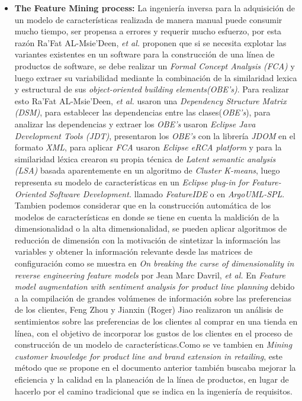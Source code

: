\begin{itemize}
	\item{ \textbf{The Feature Mining process:}}
	La ingeniería inversa para la adquisición de un modelo de características realizada de manera manual puede consumir mucho tiempo, ser propensa a errores y requerir mucho esfuerzo, por esta razón Ra'Fat AL-Msie'Deen, \textit{et al.}\cite{Al2013} proponen que si se necesita explotar las variantes existentes en un software para la construcción de una línea de productos de software, se debe realizar un \textit{Formal Concept Analysis (FCA)} y luego extraer su variabilidad mediante la combinación de la similaridad lexica y estructural de sus \textit{object-oriented building elements(OBE's)}. Para realizar esto Ra'Fat AL-Msie'Deen, \textit{et al.}\cite{Al2013} usaron una \textit{Dependency Structure Matrix (DSM)}, para establecer las dependencias entre las clases(\textit{OBE's}), para analizar las dependencias y extraer los \textit{OBE's} usaron \textit{Eclipse Java Development Tools (JDT)}, presentaron los \textit{OBE's} con la librería \textit{JDOM} en el formato \textit{XML}, para aplicar \textit{FCA} usaron \textit{Eclipse eRCA platform}  y para la similaridad léxica crearon su propia técnica de \textit{Latent semantic analysis (LSA)} basada aparentemente en un algoritmo de \textit{Cluster K-means}, luego representa su modelo de características en un \textit{Eclipse plug-in for Feature-Oriented Software Development.} llamado \textit{FeatureIDE}  o en \textit{ArgoUML-SPL}.
	Tambien podemos considerar que en la construcción automática de los modelos de características en donde se tiene en cuenta la maldición de la dimensionalidad o la alta dimensionalidad\cite{Maldonado2014}, se pueden aplicar algoritmos de reducción de dimensión con la motivación de sintetizar la información las variables y obtener la información relevante desde las matrices de configuración como se muestra en \textit{On breaking the curse of dimensionality in reverse engineering feature models}\cite{Davril2015}  por Jean Marc Davril, \textit{et al.}
	En \textit{Feature model augmentation with sentiment analysis for product line planning}\cite{Zhou2015b} debido a la compilación de grandes volúmenes de información sobre las preferencias de los clientes, Feng Zhou y Jianxin (Roger) Jiao realizaron un análisis de sentimientos sobre las preferencias de los clientes al comprar en una tienda en línea, con el objetivo de incorporar los gustos de los clientes en el proceso de construcción de un modelo de características.Como se ve tambien en \textit{Mining customer knowledge for product line and brand extension in retailing}\cite{Liao2008}, este método que se propone en el documento anterior también buscaba mejorar la eficiencia y la calidad en la planeación de la línea de productos, en lugar de hacerlo por el camino tradicional que se indica en la ingeniería de requisitos.

\end{itemize}
